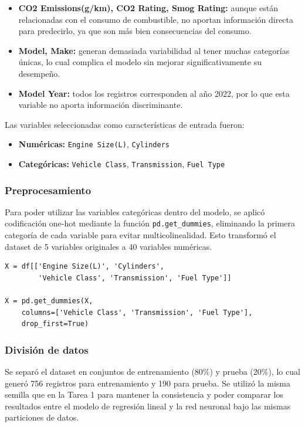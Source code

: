 \documentclass{article}
\begin{document}
\begin{itemize}
    \item \textbf{CO2 Emissions(g/km), CO2 Rating, Smog Rating:} aunque están relacionadas con el consumo de combustible, no aportan información directa para predecirlo, ya que son más bien consecuencias del consumo.
    \item \textbf{Model, Make:} generan demasiada variabilidad al tener muchas categorías únicas, lo cual complica el modelo sin mejorar significativamente su desempeño.
    \item \textbf{Model Year:} todos los registros corresponden al año 2022, por lo que esta variable no aporta información discriminante.
\end{itemize}

Las variables seleccionadas como características de entrada fueron:

\begin{itemize}
    \item \textbf{Numéricas:} \texttt{Engine Size(L)}, \texttt{Cylinders}
    \item \textbf{Categóricas:} \texttt{Vehicle Class}, \texttt{Transmission}, \texttt{Fuel Type}
\end{itemize}

\subsubsection{Preprocesamiento}

Para poder utilizar las variables categóricas dentro del modelo, se aplicó codificación one-hot mediante la función \texttt{pd.get\_dummies}, eliminando la primera categoría de cada variable para evitar multicolinealidad. Esto transformó el dataset de 5 variables originales a 40 variables numéricas.

\begin{lstlisting}
X = df[['Engine Size(L)', 'Cylinders', 
        'Vehicle Class', 'Transmission', 'Fuel Type']]

X = pd.get_dummies(X, 
    columns=['Vehicle Class', 'Transmission', 'Fuel Type'], 
    drop_first=True)
\end{lstlisting}

\subsubsection{División de datos}

Se separó el dataset en conjuntos de entrenamiento (80\%) y prueba (20\%), lo cual generó 756 registros para entrenamiento y 190 para prueba. Se utilizó la misma semilla que en la Tarea 1 para mantener la consistencia y poder comparar los resultados entre el modelo de regresión lineal y la red neuronal bajo las mismas particiones de datos.
\end{document}
